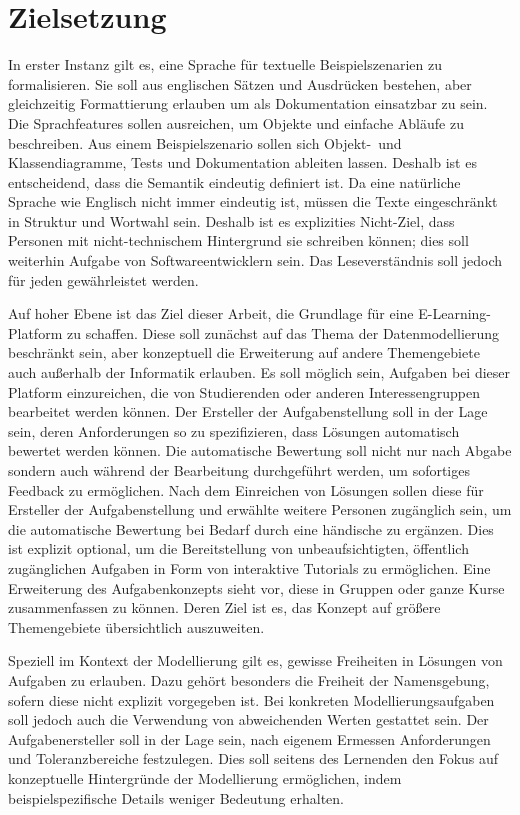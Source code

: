 \chapter{Zielsetzung}\label{ch:goals}

In erster Instanz gilt es, eine Sprache für textuelle Beispielszenarien zu formalisieren.
Sie soll aus englischen Sätzen und Ausdrücken bestehen, aber gleichzeitig Formattierung erlauben um als Dokumentation einsatzbar zu sein.
Die Sprachfeatures sollen ausreichen, um Objekte und einfache Abläufe zu beschreiben.
Aus einem Beispielszenario sollen sich Objekt-\ und Klassendiagramme, Tests und Dokumentation ableiten lassen.
Deshalb ist es entscheidend, dass die Semantik eindeutig definiert ist.
Da eine natürliche Sprache wie Englisch nicht immer eindeutig ist, müssen die Texte eingeschränkt in Struktur und Wortwahl sein.
Deshalb ist es explizities Nicht-Ziel, dass Personen mit nicht-technischem Hintergrund sie schreiben können;
dies soll weiterhin Aufgabe von Softwareentwicklern sein.
Das Leseverständnis soll jedoch für jeden gewährleistet werden.

Auf hoher Ebene ist das Ziel dieser Arbeit, die Grundlage für eine E-Learning-Platform zu schaffen.
Diese soll zunächst auf das Thema der Datenmodellierung beschränkt sein, aber konzeptuell die Erweiterung auf andere Themengebiete auch außerhalb der Informatik erlauben.
Es soll möglich sein, Aufgaben bei dieser Platform einzureichen, die von Studierenden oder anderen Interessengruppen bearbeitet werden können.
Der Ersteller der Aufgabenstellung soll in der Lage sein, deren Anforderungen so zu spezifizieren, dass Lösungen automatisch bewertet werden können.
Die automatische Bewertung soll nicht nur nach Abgabe sondern auch während der Bearbeitung durchgeführt werden, um sofortiges Feedback zu ermöglichen.
Nach dem Einreichen von Lösungen sollen diese für Ersteller der Aufgabenstellung und erwählte weitere Personen zugänglich sein, um die automatische Bewertung bei Bedarf durch eine händische zu ergänzen.
Dies ist explizit optional, um die Bereitstellung von unbeaufsichtigten, öffentlich zugänglichen Aufgaben in Form von interaktive Tutorials zu ermöglichen.
Eine Erweiterung des Aufgabenkonzepts sieht vor, diese in Gruppen oder ganze Kurse zusammenfassen zu können.
Deren Ziel ist es, das Konzept auf größere Themengebiete übersichtlich auszuweiten.

Speziell im Kontext der Modellierung gilt es, gewisse Freiheiten in Lösungen von Aufgaben zu erlauben.
Dazu gehört besonders die Freiheit der Namensgebung, sofern diese nicht explizit vorgegeben ist.
Bei konkreten Modellierungsaufgaben soll jedoch auch die Verwendung von abweichenden Werten gestattet sein.
Der Aufgabenersteller soll in der Lage sein, nach eigenem Ermessen Anforderungen und Toleranzbereiche festzulegen.
Dies soll seitens des Lernenden den Fokus auf konzeptuelle Hintergründe der Modellierung ermöglichen, indem beispielspezifische Details weniger Bedeutung erhalten.
